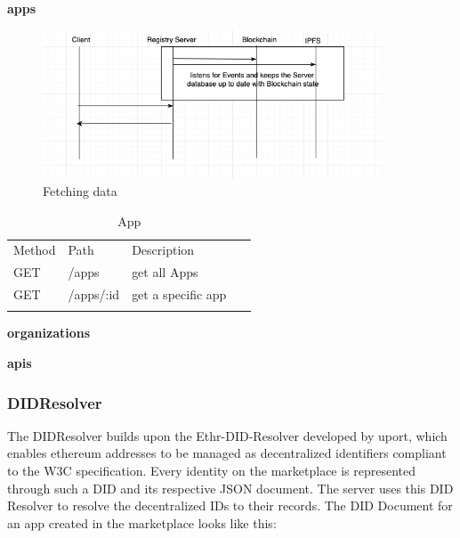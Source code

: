 \textbf{apps}

\begin{figure}[htbp]
    \centerline{\includegraphics[width=0.9\textwidth]{figures/RegistryServer.png}}
    \caption{Fetching data \label{fig:registryServer}}
\end{figure}

\begin{table}[hbt!]
    \centering
    \caption{App}
    \begin{tabular}{llll}
    Method & Path      & Description         &   \\
    GET    & /apps     & get all Apps~       &   \\
    GET    & /apps/:id & get a specific app~ &   \\
           &           &                     &  
    \end{tabular}
\end{table}

\textbf{organizations} 

\textbf{apis}

\subsubsection{DIDResolver}

The DIDResolver builds upon the Ethr-DID-Resolver developed by uport, which enables ethereum addresses to be managed as decentralized identifiers compliant to the W3C specification. Every identity on the marketplace is represented through such a DID and its respective JSON document. The server uses this DID Resolver to resolve the decentralized IDs to their records. The DID Document for an app created in the marketplace looks like this: 

